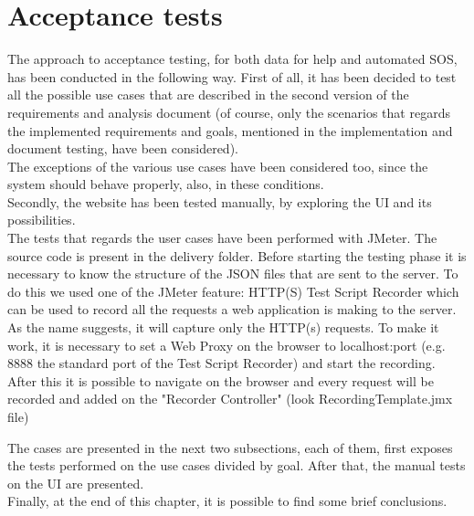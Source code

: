 \section{Acceptance tests}
The approach to acceptance testing, for both data for help and automated SOS, has been
conducted in the following way. 
First of all, it has been decided to test all the possible use cases that are described in the
second version of the requirements and analysis document (of course, only the scenarios that
regards the implemented requirements and goals, mentioned in the implementation and document testing, have been considered). \\
The exceptions of the various use cases have been considered too, since the system should
behave properly, also, in these conditions. \\
Secondly, the website has been tested manually, by exploring the UI and its possibilities. \\

The tests that regards the user cases have been performed with JMeter. The source code is present in the delivery folder. 
Before starting the testing phase it is necessary to know the structure of the JSON files that are sent to the server. To do this we used
one of the JMeter feature: HTTP(S) Test Script Recorder which can be used to record all the requests a web
application is making to the server. As the name suggests, it will capture only the HTTP(s) requests. To make it work, it is necessary to set a Web Proxy on the browser to localhost:port (e.g. 8888 the standard port of the Test Script Recorder) and start the recording. After this it is possible to navigate on the browser and every request will be recorded and added on the "Recorder Controller" (look RecordingTemplate.jmx file)

\par
The cases are presented in the next two subsections, each of them, first exposes the
tests performed on the use cases divided by goal. After that, the manual tests on the UI are presented. \\
Finally, at the end of this chapter, it is possible to find some brief conclusions. 




